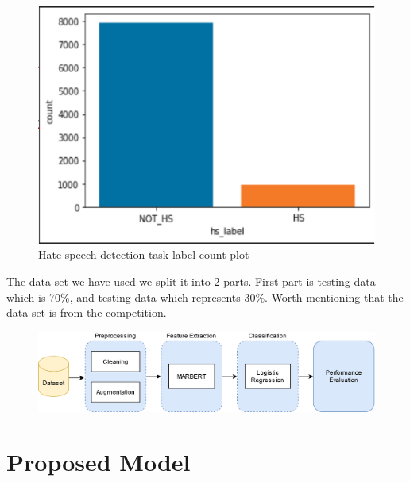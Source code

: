 \documentclass[10pt, a4paper, twoside, twocolumn]{article}
\begin{document}
\begin{figure}[htbp]
	\includegraphics[scale=0.5]{07.png}
	\caption{Hate speech detection task label count plot}
	\label{fig:hate_speech}
\end{figure}

The data set we have used we split it into 2 parts. First part is testing data which is 70\%, and testing data which represents 30\%. Worth mentioning that the data set is from the \href{https://sites.google.com/view/arabichate2022/home}{competition}.

\clearpage

\begin{figure}[ht!]
	\begin{center}
		\includegraphics[scale=0.5]{04.png}
	\end{center}
\end{figure}

\section{Proposed Model}\label{sec:proposed_model}
\end{document}
